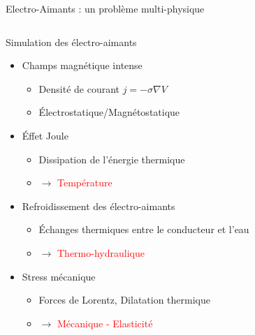 \begin{frame}{Electro-Aimants : un problème multi-physique}
  \vspace*{-0.5cm}
  \begin{columns}[c]
    \begin{column}{.7\linewidth}

      \begin{block}{Simulation des électro-aimants}
        \begin{itemize}
        \item Champs magnétique intense
          \begin{itemize}
          \item Densité de courant $j=-\sigma \nabla V$
          \item Électrostatique/Magnétostatique
          \end{itemize}

        \item Éffet Joule
          \begin{itemize}
          \item Dissipation de l'énergie thermique
          \item $\rightarrow$ \textcolor{red}{Température} \\
          \end{itemize}

        \item Refroidissement des électro-aimants
          \begin{itemize}
          \item Échanges thermiques entre le conducteur et l'eau
          \item $\rightarrow$ \textcolor{red}{Thermo-hydraulique } \\
          \end{itemize}

        \item Stress mécanique
          \begin{itemize}
          \item Forces de Lorentz, Dilatation thermique
          \item $\rightarrow$ \textcolor{red}{Mécanique - Elasticité} \\
          \end{itemize}
        \end{itemize}
      \end{block}


\end{column}
\end{columns}
\end{frame}
